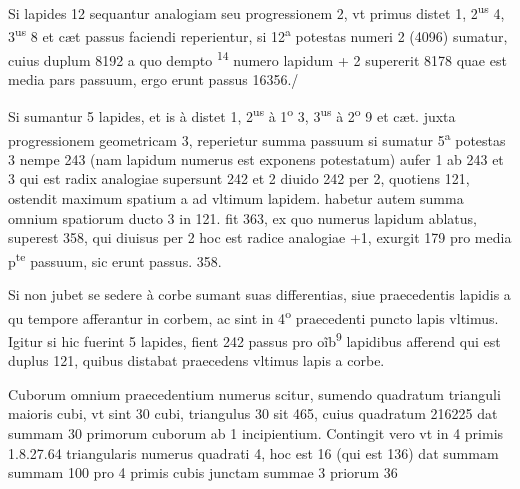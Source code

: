 \documentclass[11pt,a4paper]{article}
\begin{document}
Si lapides 12 sequantur analogiam seu progressionem 2, vt primus distet 1, 2\textsuperscript{us} 4, 3\textsuperscript{us} 8 et cæt passus faciendi reperientur, si 12\textsuperscript{a} potestas \struck{\ill{}} numeri 2 (4096) sumatur, cuius duplum 8192 a quo dempto \textsuperscript{14} numero lapidum + 2 supererit 8178 quae est media pars passuum, ergo erunt passus 16356./

Si sumantur 5 lapides, et is à \ill{} distet 1, 2\textsuperscript{us} à 1\textsuperscript{o} 3, 3\textsuperscript{us} à 2\textsuperscript{o} 9 et cæt. juxta progressionem geometricam 3, reperietur summa passuum si sumatur 5\textsuperscript{a} potestas 3 nempe 243 (nam lapidum numerus est exponens potestatum) aufer 1 ab 243 et 3 qui est radix analogiae supersunt 242 et 2 diuido 242 per 2, quotiens 121, ostendit maximum spatium a  ad vltimum lapidem. habetur autem summa omnium spatiorum ducto 3 in 121. fit 363, ex quo numerus lapidum ablatus, superest 358, qui diuisus per 2 hoc est radice analogiae +1, exurgit 179 pro media p\textsuperscript{te} passuum, sic erunt passus. 358.

Si non jubet se sedere à corbe sumant suas differentias, siue praecedentis lapidis a qu\ill{} tempore afferantur in corbem, ac sint in 4\textsuperscript{o} praecedenti puncto lapis vltimus. Igitur si hic fuerint 5 lapides, fient 242 passus pro oĩb\textsuperscript{9} lapidibus afferend qui est duplus 121, quibus distabat praecedens vltimus lapis a corbe.

Cuborum omnium praecedentium numerus scitur, sumendo quadratum trianguli maioris cubi, vt sint 30 cubi, triangulus 30 sit 465, cuius quadratum 216225 dat summam 30 primorum cuborum ab 1 incipientium. Contingit vero vt in 4 primis 1.8.27.64 triangularis numerus quadrati 4, hoc est 16 (qui est 136) dat summam  \ill{} summam 100 pro 4 primis cubis junctam summae 3 priorum 36
\end{document}
